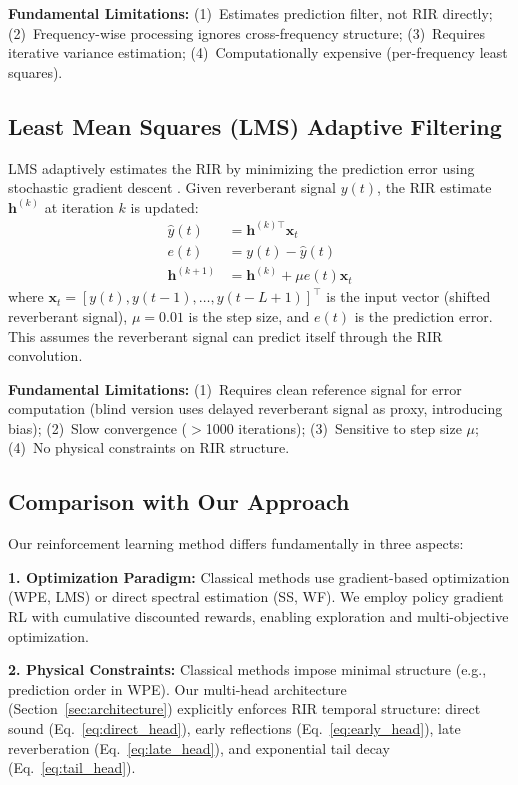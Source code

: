 \documentclass[12pt,a4paper]{article}
\begin{document}
\textbf{Fundamental Limitations:} (1)~Estimates prediction filter, not RIR directly; (2)~Frequency-wise processing ignores cross-frequency structure; (3)~Requires iterative variance estimation; (4)~Computationally expensive (per-frequency least squares).

\subsection{Least Mean Squares (LMS) Adaptive Filtering}

LMS adaptively estimates the RIR by minimizing the prediction error using stochastic gradient descent \cite{gannot2017consolidated}. Given reverberant signal $y(t)$, the RIR estimate $\mathbf{h}^{(k)}$ at iteration $k$ is updated:
\begin{align}
\hat{y}(t) &= \mathbf{h}^{(k)\top} \mathbf{x}_t \label{eq:lms_prediction} \\
e(t) &= y(t) - \hat{y}(t) \label{eq:lms_error} \\
\mathbf{h}^{(k+1)} &= \mathbf{h}^{(k)} + \mu e(t) \mathbf{x}_t \label{eq:lms_update}
\end{align}
where $\mathbf{x}_t = [y(t), y(t-1), \ldots, y(t-L+1)]^\top$ is the input vector (shifted reverberant signal), $\mu = 0.01$ is the step size, and $e(t)$ is the prediction error. This assumes the reverberant signal can predict itself through the RIR convolution.

\textbf{Fundamental Limitations:} (1)~Requires clean reference signal for error computation (blind version uses delayed reverberant signal as proxy, introducing bias); (2)~Slow convergence ($>$1000 iterations); (3)~Sensitive to step size $\mu$; (4)~No physical constraints on RIR structure.

\subsection{Comparison with Our Approach}

Our reinforcement learning method differs fundamentally in three aspects:

\textbf{1. Optimization Paradigm:} Classical methods use gradient-based optimization (WPE, LMS) or direct spectral estimation (SS, WF). We employ policy gradient RL with cumulative discounted rewards, enabling exploration and multi-objective optimization.

\textbf{2. Physical Constraints:} Classical methods impose minimal structure (e.g., prediction order in WPE). Our multi-head architecture (Section~\ref{sec:architecture}) explicitly enforces RIR temporal structure: direct sound (Eq.~\ref{eq:direct_head}), early reflections (Eq.~\ref{eq:early_head}), late reverberation (Eq.~\ref{eq:late_head}), and exponential tail decay (Eq.~\ref{eq:tail_head}).
\end{document}
